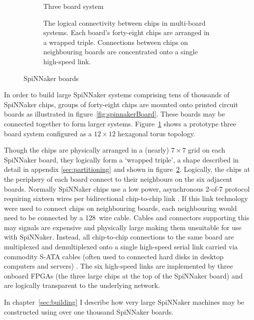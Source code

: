 \begin{figure}
\begin{subfigure}[b]{0.45\linewidth}
				\caption{Three board system}
				\label{fig:threeboard}
			\end{subfigure}
			
			\vspace*{2em}
			
			\begin{subfigure}{\linewidth}
				\center
				
				\caption{The logical connectivity between chips in multi-board systems.
				Each board's forty-eight chips are arranged in a wrapped triple.
				Connections between chips on neighbouring boards are concentrated onto
				a single high-speed link.}
				\label{fig:sata-connections}
			\end{subfigure}
			
			\caption{SpiNNaker boards}
			\label{fig:spinnaker-boards}
		\end{figure}
		
		In order to build large SpiNNaker systems comprising tens of thousands of
		SpiNNaker chips, groups of forty-eight chips are mounted onto printed
		circuit boards as illustrated in figure~\ref{fig:spinnakerBoard}. These
		boards may be connected together to form larger systems.
		Figure~\ref{fig:threeboard} shows a prototype three board system configured
		as a $12\times12$ hexagonal torus topology.
		
		Though the chips are physically arranged in a (nearly) $7\times7$ grid on
		each SpiNNaker board, they logically form a `wrapped triple', a shape
		described in detail in appendix \ref{sec:partitioning} and shown in
		figure~\ref{fig:sata-connections}. Logically, the chips at the periphery of
		each board connect to their neighbours on the six adjacent boards.
		Normally SpiNNaker chips use a low power, asynchronous 2-of-7 protocol
		requiring sixteen wires per bidirectional chip-to-chip link
		\cite{bainbridge03}. If this link technology were used to connect chips on
		neighbouring boards, each neighbouring would need to be connected by a
		128~wire cable. Cables and connectors supporting this may signals are
		expensive and physically large making them unsuitable for use with
		SpiNNaker. Instead, all chip-to-chip connections to the same board are
		multiplexed and demultiplexed onto a single high-speed serial link
		\cite{athavale05} carried via commodity S-ATA cables (often used to
		connected hard disks in desktop computers and servers) \cite{sata3spec}.
		The six high-speed links are implemented by three onboard FPGAs (the three
		large chips at the top of the SpiNNaker board) and are logically
		transparent to the underlying network.
		
		In chapter~\ref{sec:building} I describe how very large SpiNNaker machines
		may be constructed using over one thousand SpiNNaker boards.
